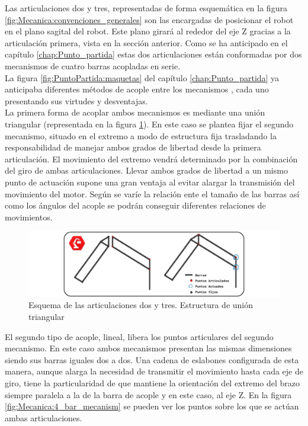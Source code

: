     Las articulaciones dos y tres, representadas de forma esquemática en la figura \ref{fig:Mecanica:convenciones_generales} son las encargadas de posicionar el robot en el plano sagital del robot. Este plano girará al rededor del eje Z gracias a la articulación primera, vista en la sección anterior. Como se ha anticipado en el capítulo \ref{chap:Punto_partida} estas dos articulaciones están conformadas por dos mecanismos de cuatro barras acopladas en serie.
    \\

    La figura \ref{fig:PuntoPartida:maquetas} del capítulo \ref{chap:Punto_partida} ya anticipaba diferentes métodos de acople entre los mecanismos , cada uno presentando sus virtudes y desventajas.
    \\

    La primera forma de acoplar ambos mecanismos es mediante una unión triangular (representada en la figura \ref{fig:Mecanica:4_bar_mecanism_triangle}). En este caso se plantea fijar el segundo mecanismo, situado en el extremo a modo de estructura fija trasladando la responsabilidad de manejar ambos grados de libertad desde la primera articulación. El movimiento del extremo vendrá determinado por la combinación del giro de ambas articulaciones. Llevar ambos grados de libertad a un mismo punto de actuación supone una gran ventaja al evitar alargar la transmisión del movimiento del motor. Según se varíe la relación ente el tamaño de las barras así como los ángulos del acople se podrán conseguir diferentes relaciones de movimientos.

    \begin{figure}[H]
       	\centering
       	\includegraphics[width=\textwidth]{figuras/Imagenes_Mecanica/mecanismos_4_barras_triangulo.jpg}
       	\caption{Esquema de las articulaciones dos y tres. Estructura de unión triangular}
       	\label{fig:Mecanica:4_bar_mecanism_triangle}
    \end{figure}

    El segundo tipo de acople, lineal, libera los puntos articulares del segundo mecanismo. En este caso ambos mecanismos presentan las mismas dimensiones siendo sus barras iguales dos a dos. Una cadena de eslabones configurada de esta manera, aunque alarga la necesidad de transmitir el movimiento hasta cada eje de giro, tiene la particularidad de que mantiene la orientación del extremo del brazo siempre paralela a la de la barra de acople y en este caso, al eje Z. En la figura \ref{fig:Mecanica:4_bar_mecanism} se pueden ver los puntos sobre los que se actúan ambas articulaciones.
    \\

